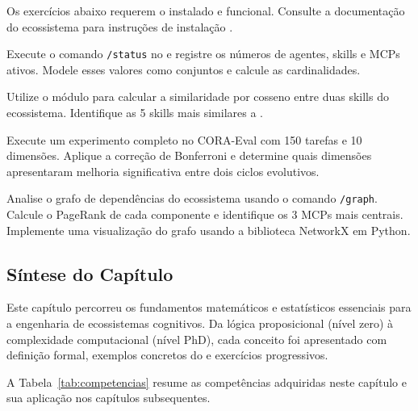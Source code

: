 Os exercícios abaixo requerem o \opencodeeco{} instalado e funcional.
Consulte a documentação do ecossistema para instruções de instalação
\cite{opencode2026ecosystem}.

\begin{exercicio}
    Execute o comando \lstinline{/status} no \opencodeeco{} e registre os
    números de agentes, skills e MCPs ativos. Modele esses valores como
    conjuntos e calcule as cardinalidades.
\end{exercicio}

\begin{exercicio}
    Utilize o módulo  para calcular a
    similaridade por cosseno entre duas skills do ecossistema. Identifique
    as 5 skills mais similares a .
\end{exercicio}

\begin{exercicio}
    Execute um experimento completo no CORA-Eval com 150 tarefas e 10
    dimensões. Aplique a correção de Bonferroni e determine quais dimensões
    apresentaram melhoria significativa entre dois ciclos evolutivos.
\end{exercicio}

\begin{exercicio}
    Analise o grafo de dependências do ecossistema usando o comando
    \lstinline{/graph}. Calcule o PageRank de cada componente e identifique
    os 3 MCPs mais centrais. Implemente uma visualização do grafo usando
    a biblioteca NetworkX em Python.
\end{exercicio}

\subsection{Síntese do Capítulo}

Este capítulo percorreu os fundamentos matemáticos e estatísticos
essenciais para a engenharia de ecossistemas cognitivos. Da lógica
proposicional (nível zero) à complexidade computacional (nível PhD), cada
conceito foi apresentado com definição formal, exemplos concretos do
\opencodeeco{} e exercícios progressivos.

A Tabela~\ref{tab:competencias} resume as competências adquiridas neste
capítulo e sua aplicação nos capítulos subsequentes.


